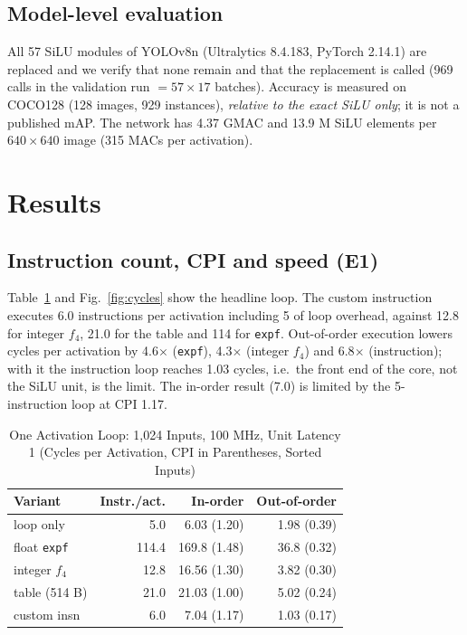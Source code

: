\documentclass[conference]{IEEEtran}
\begin{document}
\subsection{Model-level evaluation}
All 57 SiLU modules of YOLOv8n \cite{ultralytics} (Ultralytics 8.4.183, PyTorch 2.14.1) are replaced and we verify that none remain and that the replacement is called (969 calls in the validation run $=57\times17$ batches). Accuracy is measured on COCO128 (128 images, 929 instances), \emph{relative to the exact SiLU only}; it is not a published mAP. The network has 4.37 GMAC and 13.9 M SiLU elements per $640\times640$ image (315 MACs per activation).

\section{Results}
\subsection{Instruction count, CPI and speed (E1)}
Table~\ref{tab:e1} and Fig.~\ref{fig:cycles} show the headline loop. The custom instruction executes 6.0 instructions per activation including 5 of loop overhead, against 12.8 for integer $f_4$, 21.0 for the table and 114 for \texttt{expf}. Out-of-order execution lowers cycles per activation by 4.6$\times$ (\texttt{expf}), 4.3$\times$ (integer $f_4$) and 6.8$\times$ (instruction); with it the instruction loop reaches 1.03 cycles, i.e.\ the front end of the core, not the SiLU unit, is the limit. The in-order result (7.0) is limited by the 5-instruction loop at CPI 1.17.

\begin{table}[t]
\caption{One Activation Loop: 1,024 Inputs, 100 MHz, Unit Latency 1 (Cycles per Activation, CPI in Parentheses, Sorted Inputs)}
\label{tab:e1}
\centering\small
\begin{tabular}{lrrr}
\toprule
Variant & Instr./act. & In-order & Out-of-order\\
\midrule
loop only & 5.0 & 6.03 (1.20) & 1.98 (0.39)\\
float \texttt{expf} & 114.4 & 169.8 (1.48) & 36.8 (0.32)\\
integer $f_4$ & 12.8 & 16.56 (1.30) & 3.82 (0.30)\\
table (514 B) & 21.0 & 21.03 (1.00) & 5.02 (0.24)\\
custom insn & 6.0 & 7.04 (1.17) & 1.03 (0.17)\\
\bottomrule
\end{tabular}
\end{table}
\end{document}
